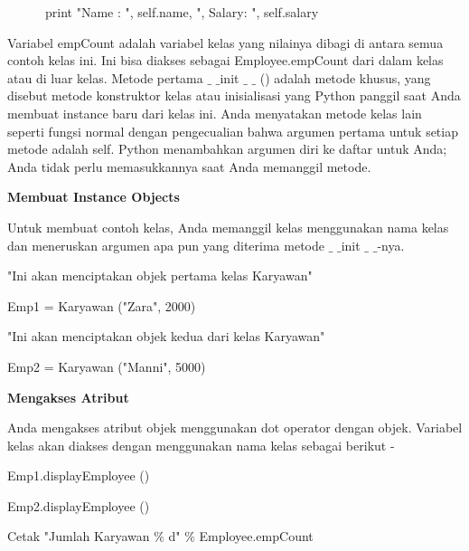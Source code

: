 \begin {enumerate}
\noindent 
~~~~~~print "Name : ", self.name,  ", Salary: ", self.salary \par
\vspace{12pt}
Variabel empCount adalah variabel kelas yang nilainya dibagi di antara semua contoh kelas ini. Ini bisa diakses sebagai Employee.empCount dari dalam kelas atau di luar kelas. Metode pertama  $  \_  $ $  \_  $init  $  \_  $ $  \_  $ () adalah metode khusus, yang disebut metode konstruktor kelas atau inisialisasi yang Python panggil saat Anda membuat instance baru dari kelas ini. Anda menyatakan metode kelas lain seperti fungsi normal dengan pengecualian bahwa argumen pertama untuk setiap metode adalah self. Python menambahkan argumen diri ke daftar untuk Anda; Anda tidak perlu memasukkannya saat Anda memanggil metode. \par
\vspace{12pt}
\noindent 
{\fontsize{14pt}{14pt}\selectfont \textbf{Membuat Instance Objects} \\} \par
\vspace{12pt}
Untuk membuat contoh kelas, Anda memanggil kelas menggunakan nama kelas dan meneruskan argumen apa pun yang diterima metode  $  \_  $ $  \_  $init $  \_  $ $  \_  $-nya. \par
\vspace{12pt}
\noindent 
"Ini akan menciptakan objek pertama kelas Karyawan" \par
\noindent 
Emp1 = Karyawan ("Zara", 2000) \par
\noindent 
"Ini akan menciptakan objek kedua dari kelas Karyawan" \par
\noindent 
Emp2 = Karyawan ("Manni", 5000) \par
\vspace{12pt}
\noindent 
{\fontsize{14pt}{14pt}\selectfont \textbf{Mengakses Atribut} \\} \par
\vspace{12pt}
Anda mengakses atribut objek menggunakan dot operator dengan objek. Variabel kelas akan diakses dengan menggunakan nama kelas sebagai berikut - \par
\vspace{12pt}
\noindent 
Emp1.displayEmployee () \par
\noindent 
Emp2.displayEmployee () \par
\noindent 
Cetak "Jumlah Karyawan $  \%  $ d" $  \%  $ Employee.empCount \par
\vspace{12pt}

\end{enumerate}
